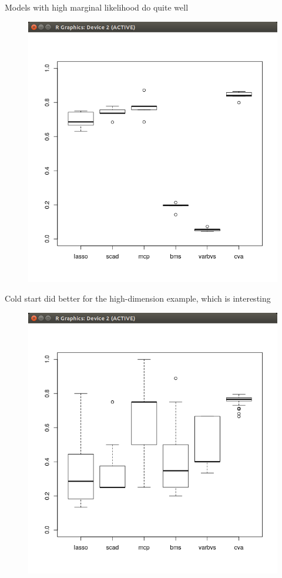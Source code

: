 \documentclass{beamer}
\begin{document}
\begin{frame}{Models with high marginal likelihood do quite well}

\begin{figure}
\includegraphics[scale=0.33]{QLT_warm_start_marginal_likelihood.png}
\end{figure}
\end{frame}

\begin{frame}{Cold start did better for the high-dimension example, which is interesting}
\begin{figure}
\includegraphics[scale=0.33]{Particle_EM_high_dimensional_cold_start.png}
\end{figure}
\end{frame}
\end{document}
